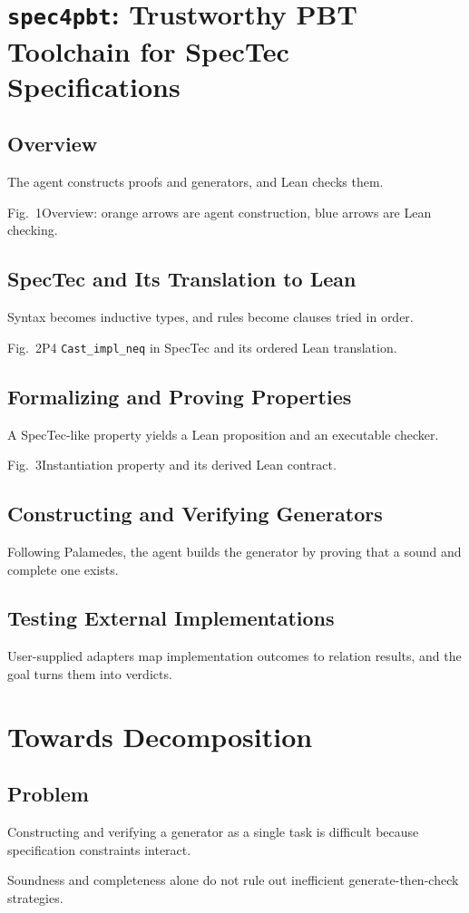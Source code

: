 \documentclass[11pt,a4paper]{article}
\newcommand{\tool}{\texttt{spec4pbt}}
\newcommand{\desc}[1]{{\small #1\par}}
\newcommand{\fig}[2]{{\small\color{gray!70!black}\textsf{Fig.~#1}\quad #2\par}}
\begin{document}
\section{\tool: Trustworthy PBT Toolchain for SpecTec Specifications}
\subsection{Overview}
\desc{The agent constructs proofs and generators, and Lean checks them.}
\fig{1}{Overview: orange arrows are agent construction, blue arrows are Lean checking.}

\subsection{SpecTec and Its Translation to Lean}
\desc{Syntax becomes inductive types, and rules become clauses tried in order.}
\fig{2}{P4 \texttt{Cast\_impl\_neq} in SpecTec and its ordered Lean translation.}

\subsection{Formalizing and Proving Properties}
\desc{A SpecTec-like property yields a Lean proposition and an executable checker.}
\fig{3}{Instantiation property and its derived Lean contract.}

\subsection{Constructing and Verifying Generators}
\desc{Following Palamedes, the agent builds the generator by proving that a sound and complete one exists.}

\subsection{Testing External Implementations}
\desc{User-supplied adapters map implementation outcomes to relation results, and the goal turns them into verdicts.}

\section{Towards Decomposition}
\subsection{Problem}
\desc{Constructing and verifying a generator as a single task is difficult because specification constraints interact.}
\desc{Soundness and completeness alone do not rule out inefficient generate-then-check strategies.}
\end{document}
